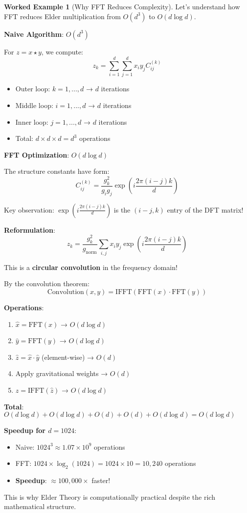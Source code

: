 \documentclass[12pt,a4paper]{article}
\theoremstyle{definition}
\newtheorem{example}{Worked Example}[section]
\theoremstyle{remark}
\begin{document}
\begin{example}[Why FFT Reduces Complexity]
Let's understand how FFT reduces Elder multiplication from $O(d^3)$ to $O(d \log d)$.

\textbf{Naive Algorithm}: $O(d^3)$

For $z = x \star y$, we compute:
$$z_k = \sum_{i=1}^{d}\sum_{j=1}^{d} x_i y_j C_{ij}^{(k)}$$

\begin{itemize}
\item Outer loop: $k = 1, ..., d$ → $d$ iterations
\item Middle loop: $i = 1, ..., d$ → $d$ iterations  
\item Inner loop: $j = 1, ..., d$ → $d$ iterations
\item Total: $d \times d \times d = d^3$ operations
\end{itemize}

\textbf{FFT Optimization}: $O(d \log d)$

The structure constants have form:
$$C_{ij}^{(k)} = \frac{g_k^2}{g_i g_j} \exp\left(i\frac{2\pi(i-j)k}{d}\right)$$

Key observation: $\exp(i\frac{2\pi(i-j)k}{d})$ is the $(i-j, k)$ entry of the DFT matrix!

\textbf{Reformulation}:
$$z_k = \frac{g_k^2}{g_{\text{norm}}} \sum_{i,j} x_i y_j \exp\left(i\frac{2\pi(i-j)k}{d}\right)$$

This is a \textbf{circular convolution} in the frequency domain!

By the convolution theorem:
$$\text{Convolution}(x, y) = \text{IFFT}(\text{FFT}(x) \cdot \text{FFT}(y))$$

\textbf{Operations}:
\begin{enumerate}
\item $\hat{x} = \text{FFT}(x)$ → $O(d \log d)$
\item $\hat{y} = \text{FFT}(y)$ → $O(d \log d)$
\item $\hat{z} = \hat{x} \cdot \hat{y}$ (element-wise) → $O(d)$
\item Apply gravitational weights → $O(d)$
\item $z = \text{IFFT}(\hat{z})$ → $O(d \log d)$
\end{enumerate}

\textbf{Total}: $O(d \log d) + O(d \log d) + O(d) + O(d) + O(d \log d) = O(d \log d)$

\textbf{Speedup for $d=1024$}:
\begin{itemize}
\item Naive: $1024^3 \approx 1.07 \times 10^9$ operations
\item FFT: $1024 \times \log_2(1024) = 1024 \times 10 = 10,240$ operations
\item \textbf{Speedup}: $\approx 100,000\times$ faster!
\end{itemize}

This is why Elder Theory is computationally practical despite the rich mathematical structure.
\end{example}
\end{document}
